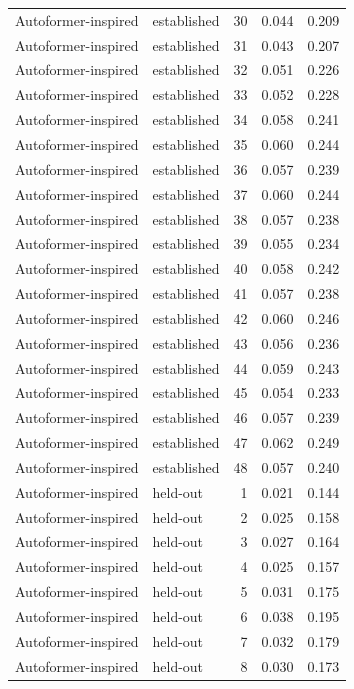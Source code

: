 \begin{tabular}{llrrr}
Autoformer-inspired & established & 30 & 0.044 & 0.209 \\
Autoformer-inspired & established & 31 & 0.043 & 0.207 \\
Autoformer-inspired & established & 32 & 0.051 & 0.226 \\
Autoformer-inspired & established & 33 & 0.052 & 0.228 \\
Autoformer-inspired & established & 34 & 0.058 & 0.241 \\
Autoformer-inspired & established & 35 & 0.060 & 0.244 \\
Autoformer-inspired & established & 36 & 0.057 & 0.239 \\
Autoformer-inspired & established & 37 & 0.060 & 0.244 \\
Autoformer-inspired & established & 38 & 0.057 & 0.238 \\
Autoformer-inspired & established & 39 & 0.055 & 0.234 \\
Autoformer-inspired & established & 40 & 0.058 & 0.242 \\
Autoformer-inspired & established & 41 & 0.057 & 0.238 \\
Autoformer-inspired & established & 42 & 0.060 & 0.246 \\
Autoformer-inspired & established & 43 & 0.056 & 0.236 \\
Autoformer-inspired & established & 44 & 0.059 & 0.243 \\
Autoformer-inspired & established & 45 & 0.054 & 0.233 \\
Autoformer-inspired & established & 46 & 0.057 & 0.239 \\
Autoformer-inspired & established & 47 & 0.062 & 0.249 \\
Autoformer-inspired & established & 48 & 0.057 & 0.240 \\
Autoformer-inspired & held-out & 1 & 0.021 & 0.144 \\
Autoformer-inspired & held-out & 2 & 0.025 & 0.158 \\
Autoformer-inspired & held-out & 3 & 0.027 & 0.164 \\
Autoformer-inspired & held-out & 4 & 0.025 & 0.157 \\
Autoformer-inspired & held-out & 5 & 0.031 & 0.175 \\
Autoformer-inspired & held-out & 6 & 0.038 & 0.195 \\
Autoformer-inspired & held-out & 7 & 0.032 & 0.179 \\
Autoformer-inspired & held-out & 8 & 0.030 & 0.173 \\

\end{tabular}
